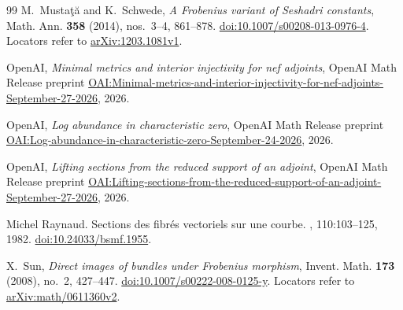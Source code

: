 \begin{thebibliography}{99}
M.~Musta\c{t}\u{a} and K.~Schwede,
\emph{A Frobenius variant of Seshadri constants},
Math. Ann. \textbf{358} (2014), nos.~3--4, 861--878.
\href{https://doi.org/10.1007/s00208-013-0976-4}{doi:10.1007/s00208-013-0976-4}.
Locators refer to \href{https://arxiv.org/abs/1203.1081v1}{arXiv:1203.1081v1}.

OpenAI,
\emph{Minimal metrics and interior injectivity for nef adjoints},
OpenAI Math Release preprint
\href{https://github.com/openai/math/blob/main/preprints/Minimal-metrics-and-interior-injectivity-for-nef-adjoints-September-27-2026/paper.pdf}{OAI:Minimal-metrics-and-interior-injectivity-for-nef-adjoints-September-27-2026},
2026.

OpenAI,
\emph{Log abundance in characteristic zero},
OpenAI Math Release preprint
\href{https://github.com/openai/math/blob/main/preprints/Log-abundance-in-characteristic-zero-September-24-2026/paper.pdf}{OAI:Log-abundance-in-characteristic-zero-September-24-2026},
2026.

OpenAI,
\emph{Lifting sections from the reduced support of an adjoint},
OpenAI Math Release preprint
\href{https://github.com/openai/math/blob/main/preprints/Lifting-sections-from-the-reduced-support-of-an-adjoint-September-27-2026/paper.pdf}{OAI:Lifting-sections-from-the-reduced-support-of-an-adjoint-September-27-2026},
2026.

Michel Raynaud.
\newblock Sections des fibr\'es vectoriels sur une courbe.
, 110:103--125, 1982.
\newblock \href{https://doi.org/10.24033/bsmf.1955}{doi:10.24033/bsmf.1955}.

X.~Sun, \emph{Direct images of bundles under Frobenius morphism},
Invent. Math. \textbf{173} (2008), no.~2, 427--447.
\href{https://doi.org/10.1007/s00222-008-0125-y}{doi:10.1007/s00222-008-0125-y}.
Locators refer to \href{https://arxiv.org/abs/math/0611360v2}{arXiv:math/0611360v2}.

\end{thebibliography}

